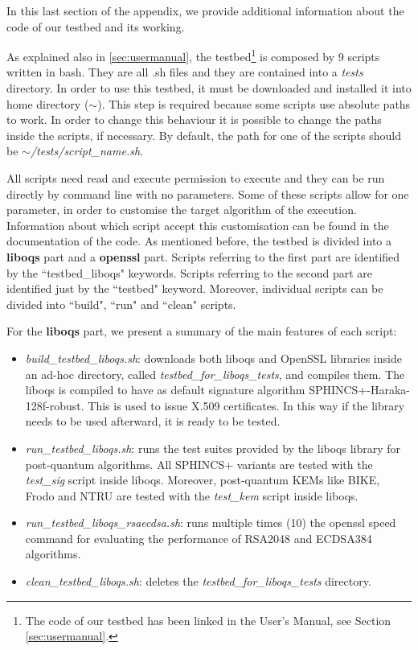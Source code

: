 \documentclass[a4paper,12pt]{article}
\begin{document}
In this last section of the appendix, we provide additional information about the code of our testbed and its working.

As explained also in \ref{sec:usermanual}, the testbed\footnote{The code of our testbed has been linked in the User's Manual, see Section \ref{sec:usermanual}.} is composed by 9 scripts written in bash. They are all .sh files and they are contained into a \textit{tests} directory. 
In order to use this testbed, it must be downloaded and installed it into home directory ($\sim$). This step is required because some scripts use absolute paths to work. In order to change this behaviour it is possible to change the paths inside the scripts, if necessary. By default, the path for one of the scripts should be \textit{$\sim$/tests/script\_name.sh}.

All scripts need read and execute permission to execute and they can be run directly by command line with no parameters. Some of these scripts allow for one parameter, in order to customise the target algorithm of the execution. Information about which script accept this customisation can be found in the documentation of the code.
As mentioned before, the testbed is divided into a \textbf{liboqs} part and a \textbf{openssl} part. 
Scripts referring to the first part are identified by the ``testbed\_liboqs" keywords. Scripts referring to the second part are identified just by the ``testbed" keyword.
Moreover, individual scripts can be divided into ``build", ``run" and ``clean" scripts.

For the \textbf{liboqs} part, we present a summary of the main features of each script:
\begin{itemize}
    \item \textit{build\_testbed\_liboqs.sh}: downloads both liboqs and OpenSSL libraries inside an ad-hoc directory, called \textit{testbed\_for\_liboqs\_tests}, and compiles them. The liboqs is compiled to have as default signature algorithm SPHINCS+-Haraka-128f-robust. This is used to issue X.509 certificates. In this way if the library needs to be used afterward, it is ready to be tested.
    \item \textit{run\_testbed\_liboqs.sh}: runs the test suites provided by the liboqs library for post-quantum algorithms. All SPHINCS+ variants are tested with the \textit{test\_sig} script inside liboqs. Moreover, post-quantum KEMs like BIKE, Frodo and NTRU are tested with the \textit{test\_kem} script inside liboqs.
    \item \textit{run\_testbed\_liboqs\_rsaecdsa.sh}: runs multiple times (10) the openssl speed command for evaluating the performance of RSA2048 and ECDSA384 algorithms.
    \item \textit{clean\_testbed\_liboqs.sh}: deletes the \textit{testbed\_for\_liboqs\_tests} directory.
\end{itemize}
\end{document}
